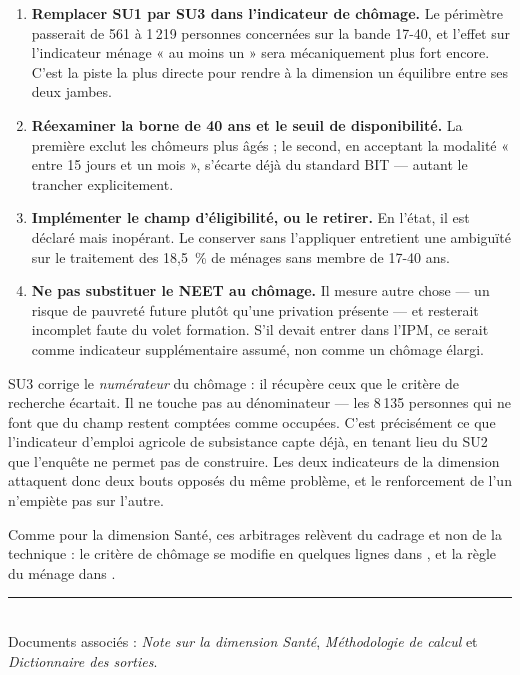 \documentclass[11pt,a4paper]{article}
\begin{document}
\begin{enumerate}
  \item \textbf{Remplacer SU1 par SU3 dans l'indicateur de chômage.} Le périmètre passerait de
  561 à 1\,219 personnes concernées sur la bande 17-40, et l'effet sur l'indicateur ménage
  « au moins un » sera mécaniquement plus fort encore. C'est la piste la plus directe pour rendre
  à la dimension un équilibre entre ses deux jambes.

  \item \textbf{Réexaminer la borne de 40 ans et le seuil de disponibilité.} La première exclut
  les chômeurs plus âgés ; le second, en acceptant la modalité « entre 15 jours et un mois »,
  s'écarte déjà du standard BIT --- autant le trancher explicitement.

  \item \textbf{Implémenter le champ d'éligibilité, ou le retirer.} En l'état, il est déclaré mais
  inopérant. Le conserver sans l'appliquer entretient une ambiguïté sur le traitement des
  18,5~\% de ménages sans membre de 17-40 ans.

  \item \textbf{Ne pas substituer le NEET au chômage.} Il mesure autre chose --- un risque de
  pauvreté future plutôt qu'une privation présente --- et resterait incomplet faute du volet
  formation. S'il devait entrer dans l'IPM, ce serait comme indicateur supplémentaire assumé, non
  comme un chômage élargi.
\end{enumerate}

\begin{retenir}
SU3 corrige le \emph{numérateur} du chômage : il récupère ceux que le critère de recherche
écartait. Il ne touche pas au dénominateur --- les 8\,135 personnes qui ne font que du champ
restent comptées comme occupées. C'est précisément ce que l'indicateur d'emploi agricole de
subsistance capte déjà, en tenant lieu du SU2 que l'enquête ne permet pas de construire. Les deux
indicateurs de la dimension attaquent donc deux bouts opposés du même problème, et le
renforcement de l'un n'empiète pas sur l'autre.
\end{retenir}

Comme pour la dimension Santé, ces arbitrages relèvent du cadrage et non de la technique : le
critère de chômage se modifie en quelques lignes dans
, et la règle du ménage dans
.

\vfill
\noindent\rule{\linewidth}{0.4pt}\\[2pt]
\small
Documents associés : \emph{Note sur la dimension Santé}, \emph{Méthodologie de calcul} et
\emph{Dictionnaire des sorties}.
\end{document}

